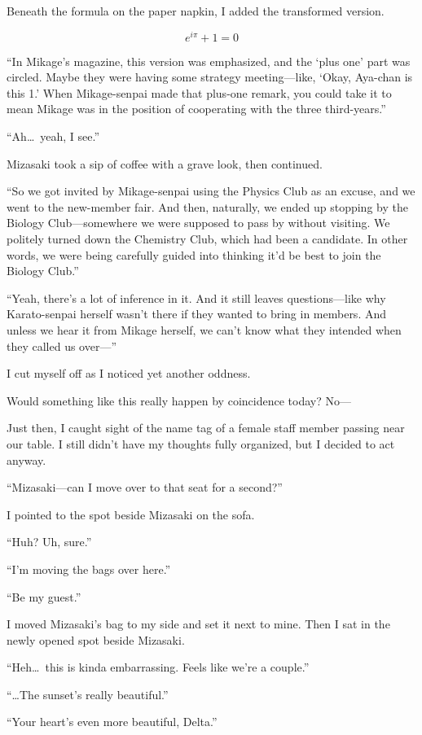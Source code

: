 \documentclass[
    a4paper,
    12pt,
    twoside,
    openany,
    UTF8,
    fontset=windows
]{ctexbook}
\begin{document}
Beneath the formula on the paper napkin, I added the transformed version.

\[
e^{i\pi} + 1 = 0
\]

``In Mikage's magazine, this version was emphasized, and the `plus one' part was circled. Maybe they were having some strategy meeting---like, `Okay, Aya-chan is this 1.' When Mikage-senpai made that plus-one remark, you could take it to mean Mikage was in the position of cooperating with the three third-years.''

``Ah\dots\ yeah, I see.''

Mizasaki took a sip of coffee with a grave look, then continued.

``So we got invited by Mikage-senpai using the Physics Club as an excuse, and we went to the new-member fair. And then, naturally, we ended up stopping by the Biology Club---somewhere we were supposed to pass by without visiting. We politely turned down the Chemistry Club, which had been a candidate. In other words, we were being carefully guided into thinking it'd be best to join the Biology Club.''

``Yeah, there's a lot of inference in it. And it still leaves questions---like why Karato-senpai herself wasn't there if they wanted to bring in members. And unless we hear it from Mikage herself, we can't know what they intended when they called us over---''

I cut myself off as I noticed yet another oddness.

Would something like this really happen by coincidence today? No---

Just then, I caught sight of the name tag of a female staff member passing near our table. I still didn't have my thoughts fully organized, but I decided to act anyway.

``Mizasaki---can I move over to that seat for a second?''

I pointed to the spot beside Mizasaki on the sofa.

``Huh? Uh, sure.''

``I'm moving the bags over here.''

``Be my guest.''

I moved Mizasaki's bag to my side and set it next to mine. Then I sat in the newly opened spot beside Mizasaki.

``Heh\dots\ this is kinda embarrassing. Feels like we're a couple.''

``\dots The sunset's really beautiful.''

``Your heart's even more beautiful, Delta.''
\end{document}
